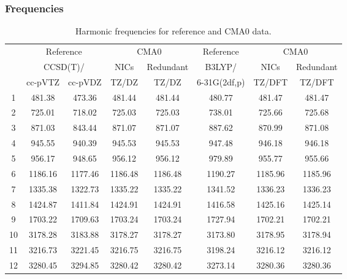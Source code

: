 \documentclass[10pt,oneside]{article}
\begin{document}
\begin{table}[h!]
\subsubsection*{Frequencies}
\centering
\caption{Harmonic frequencies for reference and CMA0 data.}
\begin{tabular}{cccccccc}
\toprule
{} & \multicolumn{2}{c}{Reference} & \multicolumn{2}{c}{CMA0} &    Reference & \multicolumn{2}{c}{CMA0} \\
{} & \multicolumn{2}{c}{CCSD(T)/} &    NICs &  Redundant &       B3LYP/ &    NICs & Redundant \\
{} &   cc-pVTZ & cc-pVDZ &   TZ/DZ &      TZ/DZ & 6-31G(2df,p) &  TZ/DFT &    TZ/DFT \\
\midrule
1  &    481.38 &  473.36 &  481.44 &     481.44 &       480.77 &  481.47 &    481.47 \\
2  &    725.01 &  718.02 &  725.03 &     725.03 &       738.01 &  725.66 &    725.68 \\
3  &    871.03 &  843.44 &  871.07 &     871.07 &       887.62 &  870.99 &    871.08 \\
4  &    945.55 &  940.39 &  945.53 &     945.53 &       947.48 &  946.18 &    946.18 \\
5  &    956.17 &  948.65 &  956.12 &     956.12 &       979.89 &  955.77 &    955.66 \\
6  &   1186.16 & 1177.46 & 1186.48 &    1186.48 &      1190.27 & 1185.96 &   1185.96 \\
7  &   1335.38 & 1322.73 & 1335.22 &    1335.22 &      1341.52 & 1336.23 &   1336.23 \\
8  &   1424.87 & 1411.84 & 1424.91 &    1424.91 &      1416.58 & 1425.16 &   1425.14 \\
9  &   1703.22 & 1709.63 & 1703.24 &    1703.24 &      1727.94 & 1702.21 &   1702.21 \\
10 &   3178.28 & 3183.88 & 3178.27 &    3178.27 &      3173.80 & 3178.95 &   3178.94 \\
11 &   3216.73 & 3221.45 & 3216.75 &    3216.75 &      3198.24 & 3216.12 &   3216.12 \\
12 &   3280.45 & 3294.85 & 3280.42 &    3280.42 &      3273.14 & 3280.36 &   3280.36 \\
\bottomrule
\end{tabular}
\end{table}
\end{document}
